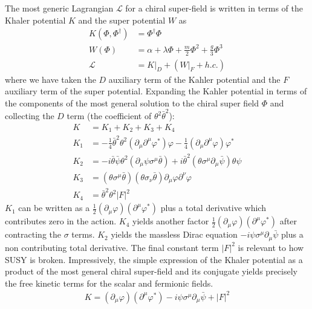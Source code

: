 The most generic Lagrangian $\mathcal{L}$ for a chiral super-field is written in terms of the Khaler potential $K$ and the super potential $W$ as 
\begin{align*}
K(\Phi,\Phi^\dagger) &= \Phi^\dagger \Phi   \\
W(\Phi) &= \alpha + \lambda \Phi + \frac{m}{2}\Phi^2 + \frac{g}{3}\Phi^3\\
\mathcal{L} &= K |_{D}  + ( W|_F + h.c.)
\end{align*}
where we have taken the $D$ auxiliary term of the Kahler potential and the $F$ auxiliary term of the super potential. Expanding the Kahler potential in terms of the components of the most general solution to the chiral
 super field $\Phi$ and collecting the $D$ term (the coefficient of $\theta^2\bar{\theta}^2$):
\begin{align*}
K &= K_1 + K_2 + K_3 + K_4 \\ 
K_1 &= -\frac{1}{4} \bar{\theta}^2 \theta^2 ( \partial_\mu \partial^\mu \varphi^*)\varphi - 
\frac{1}{4} (\partial_\mu \partial^\mu \varphi) \varphi^*  \\
K_2 &=  - i \bar{\theta} \bar{\psi} \theta^2 ( \partial_\mu \psi \sigma^\mu \bar{\theta})  +
i \bar{\theta}^2 ( \theta \sigma^\mu \partial_\mu \bar{\psi}) \theta \psi  \\
K_3 &= (\theta \sigma^\mu \bar{\theta}) (\theta \sigma_\nu \bar{\theta}) \partial_\mu \varphi \partial^\nu \varphi \\
K_4 &= \bar{\theta}^2 \theta^2 |F|^2 
\end{align*}
$K_1$ can be written as a $\frac{1}{2}(\partial_\mu \varphi)(\partial^\mu \varphi^*)$ plus a total derivative which contributes 
zero in the action. $K_4$ yields another factor $\frac{1}{2}(\partial_\mu \varphi)(\partial^\mu \varphi^*)$ after contracting the 
$\sigma$ terms. $K_2$ yields the massless Dirac equation $-i\psi\sigma^\mu \partial_\mu \bar\psi$ plus a non contributing total derivative. The final
constant term $|F|^2$ is relevant to how SUSY is broken. Impressively, the simple expression of the Khaler potential as
a product of the most general chiral super-field and its conjugate yields precisely the free kinetic terms for the scalar and fermionic
fields. 
\begin{align*}
K = (\partial_\mu \varphi)(\partial^\mu \varphi^*) -i\psi\sigma^\mu \partial_\mu \bar \psi + |F|^2 
\end{align*}

